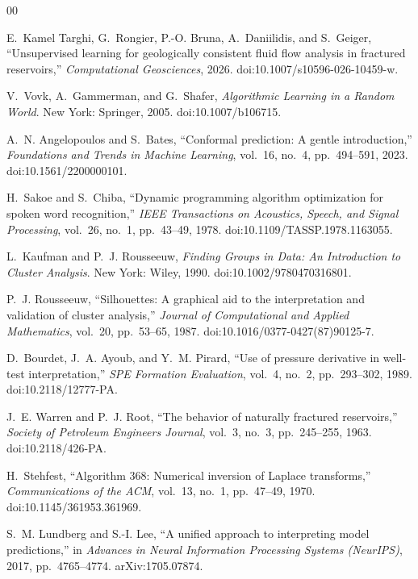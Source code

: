 \documentclass[journal]{IEEEtran}
\begin{document}
\begin{thebibliography}{00}

 E.~Kamel Targhi, G.~Rongier, P.-O. Bruna, A.~Daniilidis, and S.~Geiger, ``Unsupervised
learning for geologically consistent fluid flow analysis in fractured reservoirs,'' \emph{Computational
Geosciences}, 2026. doi:10.1007/s10596-026-10459-w.

 V.~Vovk, A.~Gammerman, and G.~Shafer, \emph{Algorithmic Learning in a Random World}. New York:
Springer, 2005. doi:10.1007/b106715.

 A.~N. Angelopoulos and S.~Bates, ``Conformal prediction: A gentle introduction,''
\emph{Foundations and Trends in Machine Learning}, vol.~16, no.~4, pp.~494--591, 2023. doi:10.1561/2200000101.

 H.~Sakoe and S.~Chiba, ``Dynamic programming algorithm optimization for spoken word
recognition,'' \emph{IEEE Transactions on Acoustics, Speech, and Signal Processing}, vol.~26, no.~1, pp.~43--49,
1978. doi:10.1109/TASSP.1978.1163055.

 L.~Kaufman and P.~J. Rousseeuw, \emph{Finding Groups in Data: An Introduction to Cluster
Analysis}. New York: Wiley, 1990. doi:10.1002/9780470316801.

 P.~J. Rousseeuw, ``Silhouettes: A graphical aid to the interpretation and validation of
cluster analysis,'' \emph{Journal of Computational and Applied Mathematics}, vol.~20, pp.~53--65, 1987.
doi:10.1016/0377-0427(87)90125-7.

 D.~Bourdet, J.~A. Ayoub, and Y.~M. Pirard, ``Use of pressure derivative in well-test
interpretation,'' \emph{SPE Formation Evaluation}, vol.~4, no.~2, pp.~293--302, 1989. doi:10.2118/12777-PA.

 J.~E. Warren and P.~J. Root, ``The behavior of naturally fractured reservoirs,'' \emph{Society
of Petroleum Engineers Journal}, vol.~3, no.~3, pp.~245--255, 1963. doi:10.2118/426-PA.

 H.~Stehfest, ``Algorithm 368: Numerical inversion of Laplace transforms,''
\emph{Communications of the ACM}, vol.~13, no.~1, pp.~47--49, 1970. doi:10.1145/361953.361969.

 S.~M. Lundberg and S.-I. Lee, ``A unified approach to interpreting model predictions,'' in
\emph{Advances in Neural Information Processing Systems (NeurIPS)}, 2017, pp.~4765--4774. arXiv:1705.07874.

\end{thebibliography}
\end{document}
